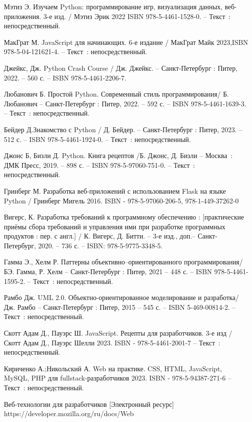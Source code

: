 
\begin{thebibliography}{9}

     Мэтиз Э. Изучаем Python: программирование игр, визуализация данных, веб-приложения. 3-е изд. / Мэтиз Эрик 2022 ISBN 978-5-4461-1528-0. – Текст~: непосредственный.
    
     МакГрат М. JavaScript для начинающих. 6-е издание / МакГрат Майк 2023,ISBN 978-5-04-121621-4. – Текст~: непосредственный.
    
     Джейкс, Дж. Python Crash Course / Дж. Джейкс. – Санкт-Петербург : Питер, 2022. – 560 с. – ISBN 978-5-4461-2206-7.
    
     Любанович Б. Простой Python. Современный стиль программирования/ Б. Любанович – Санкт-Петербург : Питер, 2022. – 592 с. – ISBN 978-5-4461-1639-3. – Текст~: непосредственный.
    
     Бейдер Д.Знакомство с Python / Д. Бейдер. – Санкт-Петербург : Питер, 2023. – 512 с. – ISBN 978-5-4461-1924-0. – Текст~: непосредственный.
    
	 Джонс Б, Бизли Д. Python. Книга рецептов /Б. Джонс, Д. Бизли – Москва~: ДМК Пресс, 2019. – 898 с. – ISBN 978-5-97060-751-0. – Текст~: непосредственный.
	
	 Гринберг М. Разработка веб-приложений с использованием Flask на языке Python / Гринберг Мигель 2016. ISBN - 978-5-97060-206-5, 978-1-449-37262-0
	
	 Вигерс, К. Разработка требований к программному обеспечению : [практические приёмы сбора требований и управления ими при разработке программных продуктов : пер. с англ.] / К. Вигерс, Д. Битти. – 3-е изд., доп.– Санкт-Петербург, 2020. – 736 с. – ISBN: 978-5-9775-3348-5. 
	
	 Гамма Э., Хелм Р. Паттерны объективно–ориентированного программирования/ БЭ. Гамма, Р. Хелм – Санкт-Петербург : Питер, 2021 – 448 с. – ISBN 978-5-4461-1595-2. – Текст~: непосредственный.
	
	 Рамбо  Дж. UML 2.0. Объектно-ориентированное моделирование и разработка/ Дж. Рамбо – Санкт-Петербург : Питер, 2015 – 545 с. – ISBN 5-469-00814-2. – Текст~: непосредственный. 
	   
	 Скотт Адам Д., Пауэрс Ш. JavaScript. Рецепты для разработчиков. 3-е изд / Скотт Адам Д., Пауэрс Шелли 2023.  ISBN - 978-5-4461-2001-7 – Текст~: непосредственный. 
	
	 Кириченко А.;Никольский А. Web на практике. CSS, HTML, JavaScript, MySQL, PHP для fullstack-разработчиков 2023. ISBN - 978-5-94387-271-6 – Текст~: непосредственный. 
	
	 Веб-технологии для разработчиков [Электронный ресурс] https://developer.mozilla.org/ru/docs/Web 
	
\end{thebibliography}
